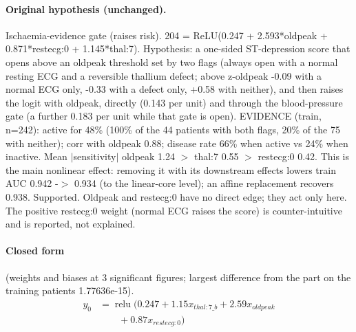 \documentclass[a4paper,10pt]{article}
\newif\ifreviewmarks
\newcommand{\reviewrule}{\noindent{\color{BrickRed}\rule{\linewidth}{0.8pt}}}
\newenvironment{drafted}[1][]{%
  \ifreviewmarks\par\addvspace{\medskipamount}\reviewrule\par\nopagebreak
  \noindent{\color{BrickRed}\sffamily\footnotesize\textbf{Thesis Draft}\quad #1\hfill review}\par\nopagebreak\smallskip\fi}{%
  \ifreviewmarks\par\smallskip\noindent{\color{BrickRed}\sffamily\footnotesize end of thesis draft}\par\nopagebreak\reviewrule\par\medskip\fi}
\begin{document}
\begin{drafted}[plain-language layer: heart-s5-c1]
\paragraph{Original hypothesis (unchanged).} Ischaemia-evidence gate (raises risk). 204 = ReLU(0.247 + 2.593*oldpeak + 0.871*restecg:0 + 1.145*thal:7). Hypothesis: a one-sided ST-depression score that opens above an oldpeak threshold set by two flags (always open with a normal resting ECG and a reversible thallium defect; above z-oldpeak -0.09 with a normal ECG only, -0.33 with a defect only, +0.58 with neither), and then raises the logit with oldpeak, directly (0.143 per unit) and through the blood-pressure gate (a further 0.183 per unit while that gate is open). EVIDENCE (train, n=242): active for 48\% (100\% of the 44 patients with both flags, 20\% of the 75 with neither); corr with oldpeak 0.88; disease rate 66\% when active vs 24\% when inactive. Mean $|$sensitivity$|$ oldpeak 1.24 $>$ thal:7 0.55 $>$ restecg:0 0.42. This is the main nonlinear effect: removing it with its downstream effects lowers train AUC 0.942 -$>$ 0.934 (to the linear-core level); an affine replacement recovers 0.938. Supported. Oldpeak and restecg:0 have no direct edge; they act only here. The positive restecg:0 weight (normal ECG raises the score) is counter-intuitive and is reported, not explained.
\paragraph{Closed form} {\footnotesize(weights and biases at 3 significant figures; largest difference from the part on the training patients 1.77636e-15).}
{\small\begingroup\allowdisplaybreaks
\begin{align*}
y_{0} &= \operatorname{relu}\bigl(0.247 + 1.15 x_{thal:7\_b} + 2.59 x_{oldpeak} \\
&\qquad + 0.87 x_{restecg:0}\bigr)
\end{align*}\endgroup}


\end{drafted}
\end{document}
